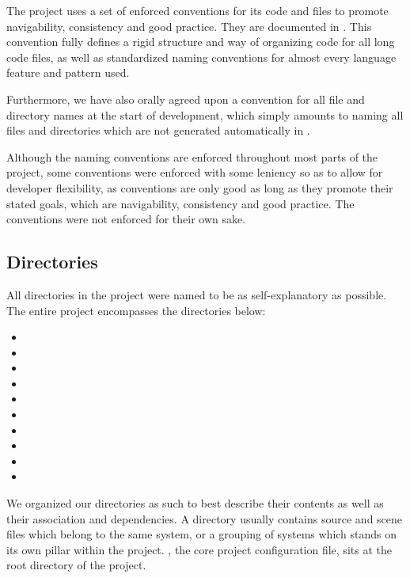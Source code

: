\documentclass[../Main.tex]{subfiles}
\begin{document}
The project uses a set of enforced conventions for its code and files to promote navigability, consistency and good practice. They are documented in . This convention fully defines a rigid structure and way of organizing code for all long code files, as well as standardized naming conventions for almost every language feature and pattern used.

Furthermore, we have also orally agreed upon a convention for all file and directory names at the start of development, which simply amounts to naming all files and directories which are not generated automatically in .

Although the naming conventions are enforced throughout most parts of the project, some conventions were enforced with some leniency so as to allow for developer flexibility, as conventions are only good as long as they promote their stated goals, which are navigability, consistency and good practice. The conventions were not enforced for their own sake.

\subsection{Directories}\label{sec:directories}

All directories in the project were named to be as self-explanatory as possible. The entire project encompasses the directories below:

\begin{itemize}
    \item {}
    \item {}
    \item {}
    \item {}
    \item {}
    \item {}
    \item {}
    \item {}
    \item {}
    \item {}
\end{itemize}

We organized our directories as such to best describe their contents as well as their association and dependencies. A directory usually contains source and scene files which belong to the same system, or a grouping of systems which stands on its own pillar within the project. , the core project configuration file, sits at the root directory of the project.
\end{document}
